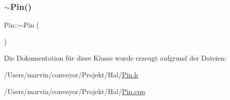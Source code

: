 \hypertarget{class_pin_a462c14c45d3d653731dde638aa6e7bb7}{}\label{class_pin_a462c14c45d3d653731dde638aa6e7bb7} 
\subsubsection{\texorpdfstring{$\sim$\+Pin()}{~Pin()}}
{\footnotesize\ttfamily Pin\+::$\sim$\+Pin (\begin{DoxyParamCaption}{ }\end{DoxyParamCaption})\hspace{0.3cm}{\ttfamily [virtual]}}



Die Dokumentation für diese Klasse wurde erzeugt aufgrund der Dateien\+:\begin{DoxyCompactItemize}
\item 
/\+Users/marvin/conveyor/\+Projekt/\+Hal/\hyperlink{_pin_8h}{Pin.\+h}\item 
/\+Users/marvin/conveyor/\+Projekt/\+Hal/\hyperlink{_pin_8cpp}{Pin.\+cpp}\end{DoxyCompactItemize}
